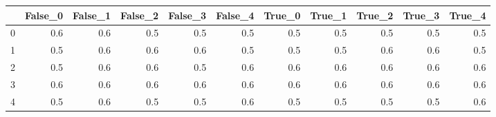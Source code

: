 \begin{tabular}{lrrrrrrrrrr}
\toprule
{} &  False\_0 &  False\_1 &  False\_2 &  False\_3 &  False\_4 &  True\_0 &  True\_1 &  True\_2 &  True\_3 &  True\_4 \\ \hline
\midrule
0 &      0.6 &      0.6 &      0.5 &      0.5 &      0.5 &     0.5 &     0.5 &     0.5 &     0.5 &     0.5 \\ \hline
1 &      0.5 &      0.6 &      0.6 &      0.6 &      0.5 &     0.5 &     0.5 &     0.6 &     0.6 &     0.5 \\ \hline
2 &      0.5 &      0.6 &      0.6 &      0.5 &      0.6 &     0.6 &     0.6 &     0.6 &     0.6 &     0.6 \\ \hline
3 &      0.6 &      0.6 &      0.6 &      0.6 &      0.6 &     0.6 &     0.6 &     0.6 &     0.6 &     0.6 \\ \hline
4 &      0.5 &      0.6 &      0.5 &      0.5 &      0.6 &     0.5 &     0.5 &     0.5 &     0.5 &     0.6 \\ \hline
\bottomrule
\end{tabular}

